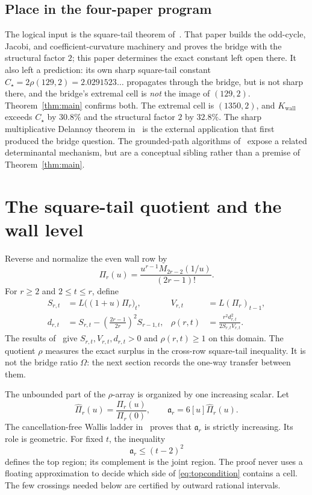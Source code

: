 \documentclass[11pt,a4paper]{article}
\theoremstyle{plain}
\theoremstyle{remark}
\newcommand{\Kw}{K_{\mathrm{wall}}}
\newcommand{\level}{\mathfrak a}
\begin{document}
\subsection{Place in the four-paper program}

The logical input is the square-tail theorem of~\cite{squaretail}.  That paper
builds the odd-cycle, Jacobi, and coefficient-curvature machinery and proves
the bridge with the structural factor $2$; this paper determines the exact
constant left open there.  It also left a prediction: its own sharp
square-tail constant $C_\star=2\rho(129,2)=2.0291523\ldots$ propagates
through the bridge, but is not sharp there, and the bridge's extremal cell is
\emph{not} the image of $(129,2)$.  Theorem~\ref{thm:main} confirms both.  The
extremal cell is $(1350,2)$, and $\Kw$ exceeds $C_\star$ by $30.8\%$ and the
structural factor $2$ by $32.8\%$.  The sharp multiplicative Delannoy theorem
in~\cite{delannoy} is the external application that first produced the bridge
question.  The grounded-path algorithms of~\cite{greenpath} expose a related
determinantal mechanism, but are a conceptual sibling rather than a premise of
Theorem~\ref{thm:main}.

\section{The square-tail quotient and the wall level}\label{sec:objects}

Reverse and normalize the even wall row by
\begin{equation}\label{eq:Pi}
 \Pi_r(u)=\frac{u^{r-1}M_{2r-2}(1/u)}{(2r-1)!}.
\end{equation}
For $r\ge2$ and $2\le t\le r$, define
\begin{align}
 S_{r,t}&=L\bigl((1+u)\Pi_r\bigr)_t,&
 V_{r,t}&=L(\Pi_r)_{t-1},\label{eq:SV}\\
 d_{r,t}&=S_{r,t}-\left(\frac{2r-1}{2r}\right)^2S_{r-1,t},&
 \rho(r,t)&=\frac{r^2d_{r,t}^2}{2S_{r,t}V_{r,t}}.\label{eq:drho}
\end{align}
The results of~\cite{squaretail} give $S_{r,t},V_{r,t},d_{r,t}>0$ and
$\rho(r,t)\ge1$ on this domain.  The quotient $\rho$ measures the exact
surplus in the cross-row square-tail inequality.  It is not the bridge ratio
$\Omega$: the next section records the one-way transfer between them.

The unbounded part of the $\rho$-array is organized by one increasing scalar.
Let
\[
 \widehat\Pi_r(u)=\frac{\Pi_r(u)}{\Pi_r(0)},
 \qquad
 \level_r=6[u]\widehat\Pi_r(u).
\]
The cancellation-free Wallis ladder in~\cite{squaretail} proves that
$\level_r$ is strictly increasing.  Its role is geometric.  For fixed $t$,
the inequality
\begin{equation}\label{eq:topcondition}
 \level_r\le(t-2)^2
\end{equation}
defines the top region; its complement is the joint region.  The proof never
uses a floating approximation to decide which side of
\eqref{eq:topcondition} contains a cell.  The few crossings needed below are
certified by outward rational intervals.
\end{document}
